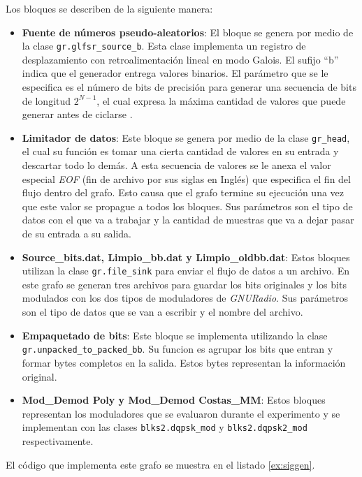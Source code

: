 Los bloques se describen de la siguiente manera:

\begin{itemize}
  \item \textbf{Fuente de n\'umeros pseudo-aleatorios}: El bloque se genera por medio de la clase
  \verb|gr.glfsr_source_b|. Esta clase implementa un registro de desplazamiento con
  retroalimentaci\'on lineal en modo Galois. El sufijo ``b'' indica que el generador entrega valores
  binarios. El par\'ametro que se le especifica es el n\'umero de bits de precisi\'on para generar
  una secuencia de bits de longitud $2^{N-1}$, el cual expresa la m\'axima cantidad de valores
  que puede generar antes de ciclarse \cite{xilinx}. 
  \item \textbf{Limitador de datos}: Este bloque se genera por medio de la clase \verb|gr_head|, el
  cual su funci\'on es tomar una cierta cantidad de valores en su entrada y descartar todo lo
  dem\'as. A esta secuencia de valores se le anexa el valor especial \emph{EOF} (fin de archivo por sus siglas en Ingl\'es) que
  especifica el fin del flujo dentro del grafo. Esto causa que el grafo termine su ejecuci\'on una vez que
  este valor se propague a todos los bloques. Sus par\'ametros son el tipo de datos con el que va a
  trabajar y la cantidad de muestras que va a dejar pasar de su entrada a su salida.
  \item \textbf{Source\_bits.dat, Limpio\_bb.dat y Limpio\_oldbb.dat}: Estos bloques utilizan la
  clase \verb|gr.file_sink| para enviar el flujo de datos a un archivo. En este grafo se generan tres
  archivos para guardar los bits originales y los bits modulados con los dos tipos de moduladores
  de \emph{GNURadio}. Sus par\'ametros son el tipo de datos que se van a escribir y el nombre del
  archivo.
  \item \textbf{Empaquetado de bits}: Este bloque se implementa utilizando la clase \\
  \verb|gr.unpacked_to_packed_bb|. Su funcion es agrupar los bits que entran y formar bytes completos
  en la salida. Estos bytes representan la informaci\'on original.
  \item \textbf{Mod\_Demod Poly y Mod\_Demod Costas\_MM}: Estos bloques representan los moduladores
  que se evaluaron durante el experimento y se implementan con las clases \verb|blks2.dqpsk_mod| y
  \verb|blks2.dqpsk2_mod| respectivamente.
\end{itemize}

El c\'odigo que implementa este grafo se muestra en el listado \ref{ex:siggen}.

